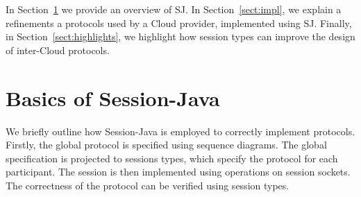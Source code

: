 \documentclass[10pt]{llncs}
\begin{document}


In Section~\ref{sect:basics} we provide an overview of SJ.
In Section~\ref{sect:impl}, we explain a refinements a protocols used by a Cloud provider, implemented using SJ. %
Finally, in Section~\ref{sect:highlights}, we highlight how session types can improve the design of inter-Cloud protocols.


\section{Basics of Session-Java}
\label{sect:basics}

We briefly outline how Session-Java is employed to correctly implement protocols.
Firstly, the global protocol is specified using sequence diagrams. The global specification is projected to sessions types, which specify the protocol for each participant.
The session is then implemented using operations on session sockets. The correctness of the protocol can be verified using session types.

\end{document}
